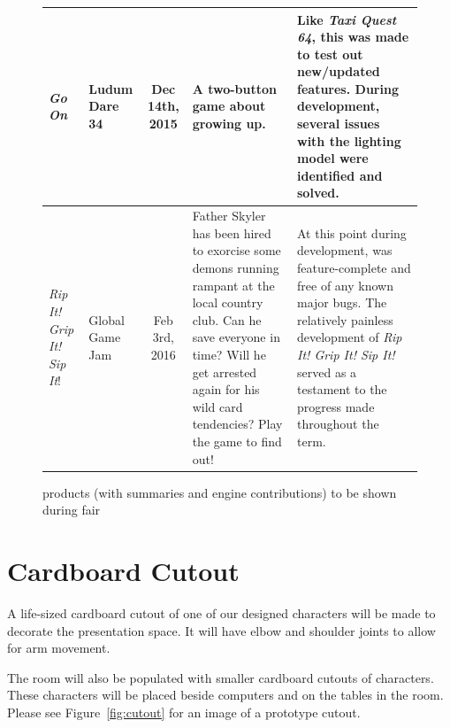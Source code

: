 \documentclass{GlobalDocument}
\begin{document}
\begin{figure}[htb]
\begin{tabular}{ | p{3cm} | p{3cm} | c | p{5.5cm} | p{6cm} |}
    \textit{Go On}&
    Ludum Dare 34&
    Dec 14th, 2015&
    A two-button game about growing up.&
    Like \textit{Taxi Quest 64}, this was made to test out new/updated features. During development, several issues with the lighting model were identified and solved.\\ \hline
    
    \textit{Rip It! Grip It! Sip It}! &
    Global Game Jam&
    Feb 3rd, 2016&
    Father Skyler has been hired to exorcise some demons running rampant at the local country club. Can he save everyone in time? Will he get arrested again for his wild card tendencies? Play the game to find out! &
    At this point during development, \ourengine{} was feature-complete and free of any known major bugs. The relatively painless development of \textit{Rip It! Grip It! Sip It!} served as a testament to the progress made throughout the term.\\ \hline
    
    \end{tabular}
\caption{\ourengine{} products (with summaries and engine contributions) to be shown during fair}
\label{fig:st_products}
\end{figure}

\section{Cardboard Cutout}
A life-sized cardboard cutout of one of our designed characters will be made to decorate the presentation space. It will have elbow and shoulder joints to allow for arm movement. 

The room will also be populated with smaller cardboard cutouts of characters. These characters will be placed beside computers and on the tables in the room. Please see Figure~\ref{fig:cutout} for an image of a prototype cutout.
\end{document}
